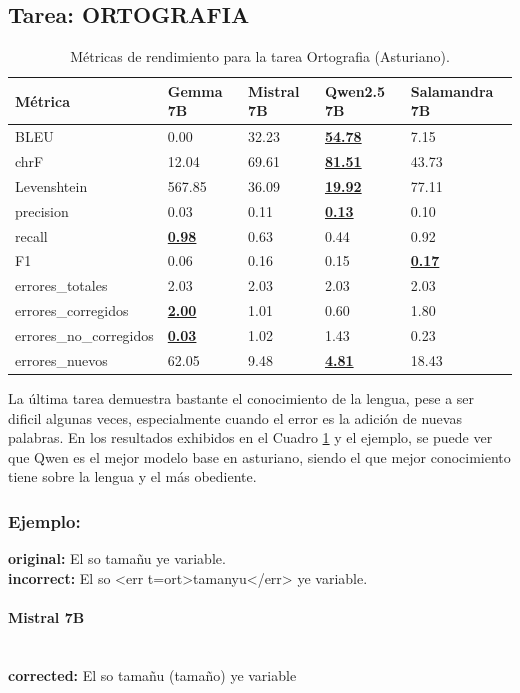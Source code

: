 \subsection{Tarea: ORTOGRAFIA}\label{tarea-ortografia}
\begin{longtable}[]{@{}lllll@{}}
\toprule\noalign{}
Métrica & Gemma 7B & Mistral 7B & Qwen2.5 7B & Salamandra 7B \\
\midrule\noalign{}
\endhead
\bottomrule\noalign{}
\caption{Métricas de rendimiento para la tarea Ortografia (Asturiano).}
\label{tab:metricas_ortografia_Asturiano}
\endlastfoot
BLEU & 0.00 & 32.23 & \textbf{\underline{54.78}} & 7.15 \\
chrF & 12.04 & 69.61 & \textbf{\underline{81.51}} & 43.73 \\
Levenshtein & 567.85 & 36.09 & \textbf{\underline{19.92}} & 77.11 \\
precision & 0.03 & 0.11 & \textbf{\underline{0.13}} & 0.10 \\
recall & \textbf{\underline{0.98}} & 0.63 & 0.44 & 0.92 \\
F1 & 0.06 & 0.16 & 0.15 & \textbf{\underline{0.17}} \\
errores\_totales & 2.03 & 2.03 & 2.03 & 2.03 \\
errores\_corregidos & \textbf{\underline{2.00}} & 1.01 & 0.60 & 1.80 \\
errores\_no\_corregidos & \textbf{\underline{0.03}} & 1.02 & 1.43 & 0.23 \\
errores\_nuevos & 62.05 & 9.48 & \textbf{\underline{4.81}} & 18.43 \\
\end{longtable}
La última tarea  demuestra bastante el conocimiento de la lengua, pese a ser dificil algunas veces, especialmente cuando el error es la adición de nuevas palabras. En los resultados exhibidos en el Cuadro \ref{tab:metricas_ortografia_Asturiano} y el ejemplo, se puede ver que Qwen es el mejor modelo base en asturiano, siendo el que mejor conocimiento tiene sobre la lengua y el más obediente.

\subsubsection{Ejemplo:}
\textbf{original:} El so tamañu ye variable.\\
\textbf{incorrect:} El so {\textless}err t=ort{\textgreater}tamanyu{\textless}/err{\textgreater} ye variable.

\paragraph{Mistral 7B}~\\
\textbf{corrected:} El so tamañu (tamaño) ye variable

